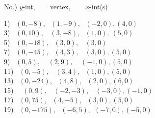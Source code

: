 \documentclass[12pt]{book}
\theoremstyle{definition}
\begin{document}
\begin{center}
No.) $y$-int, ~~~ vertex, ~~~ $x$-int(s)
\end{center}
\begin{multicols}{2}
	1)~ $(0,-8), ~~~ (1,-9), ~~~ (-2,0), (4,0)$\\
  3)~ $(0,10), ~~~~ (3,-8), ~~~ (1,0), ~(5,0)$\\
  5)~ $(0,-18), ~~~ (3,0), ~~~~ (3,0)$\\
  7)~ $(0,-45), ~~~ (4,3), ~~~~ (3,0), (5,0)$\\
  9)~ $(0,5), ~~~~~ (2,9), ~~~~~ (-1,0), (5,0)$\\
  11)~ $(0,-5), ~~~~ (3,4), ~~~ (1,0), (5,0)$\\
  13)~ $(0,-24), ~~~ (4,8), ~~~ (2,0), (6,0)$\\
  15)~~ $(0,9), ~~~~ (-2,-3), ~~~~ (-3,0), (-1,0)$\\
  17)~ $(0,75), ~~~ (4,-5), ~~~ (3,0), (5,0)$\\
  19)~ $(0,-175), ~~~ (-6,5), ~~ (-7,0), (-5,0)$%
\end{multicols}
\end{document}
